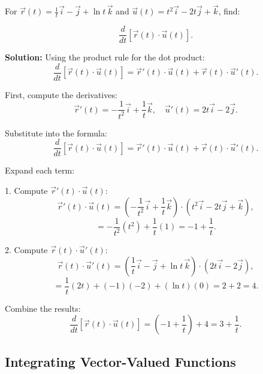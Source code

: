 \documentclass[12pt]{article}
\theoremstyle{beautifulthm}
\begin{document}
\begin{tcolorbox}[colback=examplebg, colframe=red!75!black, title=\textbf{EXAMPLE 4: Using Properties of the Derivative}, fonttitle=\bfseries, sharp corners]

For $\vec{r}(t) = \frac{1}{t} \vec{i} - \vec{j} + \ln t \, \vec{k}$ and $\vec{u}(t) = t^2 \vec{i} - 2t \vec{j} + \vec{k}$, find:

\[
\frac{d}{dt} \left[ \vec{r}(t) \cdot \vec{u}(t) \right].
\]

\tcblower
\textbf{Solution:} 
Using the product rule for the dot product:
\[
\frac{d}{dt} \left[ \vec{r}(t) \cdot \vec{u}(t) \right] = \vec{r}'(t) \cdot \vec{u}(t) + \vec{r}(t) \cdot \vec{u}'(t).
\]

First, compute the derivatives:
\[
\vec{r}'(t) = -\frac{1}{t^2} \vec{i} + \frac{1}{t} \vec{k}, \quad \vec{u}'(t) = 2t \vec{i} - 2 \vec{j}.
\]

Substitute into the formula:
\[
\frac{d}{dt} \left[ \vec{r}(t) \cdot \vec{u}(t) \right] = \vec{r}'(t) \cdot \vec{u}(t) + \vec{r}(t) \cdot \vec{u}'(t).
\]

Expand each term:

1. Compute $\vec{r}'(t) \cdot \vec{u}(t)$:
\[
\vec{r}'(t) \cdot \vec{u}(t) = \left(-\frac{1}{t^2} \vec{i} + \frac{1}{t} \vec{k} \right) \cdot \left( t^2 \vec{i} - 2t \vec{j} + \vec{k} \right),
\]
\[
= -\frac{1}{t^2} (t^2) + \frac{1}{t} (1) = -1 + \frac{1}{t}.
\]

2. Compute $\vec{r}(t) \cdot \vec{u}'(t)$:
\[
\vec{r}(t) \cdot \vec{u}'(t) = \left( \frac{1}{t} \vec{i} - \vec{j} + \ln t \, \vec{k} \right) \cdot \left( 2t \vec{i} - 2 \vec{j} \right),
\]
\[
= \frac{1}{t} (2t) + (-1)(-2) + (\ln t)(0) = 2 + 2 = 4.
\]

Combine the results:
\[
\frac{d}{dt} \left[ \vec{r}(t) \cdot \vec{u}(t) \right] = (-1 + \frac{1}{t}) + 4 = 3 + \frac{1}{t}.
\]
\end{tcolorbox}


\newpage
\subsection{Integrating Vector-Valued Functions}
\end{document}
